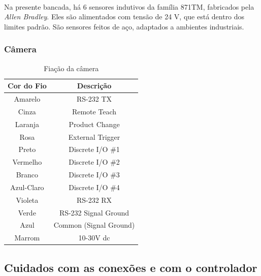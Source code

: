 \documentclass[a4paper,11pt]{scrartcl} %
\numberwithin{equation}{section} %
\numberwithin{figure}{section} %
\numberwithin{table}{section} %
\begin{document}
\paragraph{} Na presente bancada, há 6 sensores indutivos da família 871TM, fabricados pela \textit{Allen Bradley}. Eles são alimentados com tensão de 24 V, que está dentro dos limites padrão. São sensores feitos de aço, adaptados a ambientes industriais.

\subsubsection{Câmera}
\begin{table}[!ht]
  \centering
  \begin{tabular}{|c|c|}
    \hline Cor do Fio & Descrição \\ 
    \hline Amarelo & RS-232 TX \\ 
    \hline Cinza & Remote Teach \\ 
    \hline Laranja & Product Change \\
    \hline Rosa & External Trigger \\ 
    \hline Preto & Discrete I/O \#1 \\ 
    \hline Vermelho & Discrete I/O \#2 \\ 
    \hline Branco & Discrete I/O \#3 \\ 
    \hline Azul-Claro & Discrete I/O \#4 \\ 
    \hline Violeta & RS-232 RX \\ 
    \hline Verde & RS-232 Signal Ground \\ 
    \hline Azul & Common (Signal Ground) \\ 
    \hline Marrom & 10-30V dc \\ \hline  
  \end{tabular}
  \caption{Fiação da câmera\label{FioCamera}} 
\end{table}

\subsection{Cuidados com as conexões e com o controlador}
\end{document}
